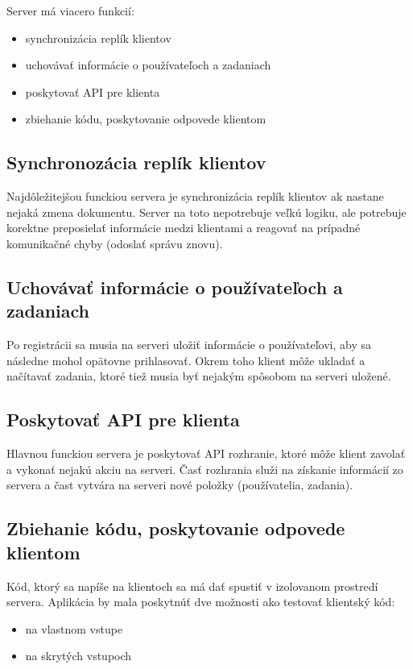 Server má viacero funkcií:
\begin{itemize}
\item synchronizácia replík klientov
\item uchovávať informácie o používateľoch a zadaniach
\item poskytovať API pre klienta
\item zbiehanie kódu, poskytovanie odpovede klientom
\end{itemize}

\subsection{Synchronozácia replík klientov}
Najdôležitejšou funckiou servera je synchronizácia replík klientov ak nastane nejaká zmena
dokumentu. Server na toto nepotrebuje veľkú logiku, ale potrebuje korektne preposielať informácie
medzi klientami a reagovať na prípadné komunikačné chyby (odoslať správu znovu).

\subsection{Uchovávať informácie o používateľoch a zadaniach}
Po registrácii sa musia na serveri uložiť informácie o používateľovi, aby sa následne mohol opätovne
prihlasovať. Okrem toho klient môže ukladať a načítavať zadania, ktoré tiež musia byť nejakým
spôsobom na serveri uložené.

\subsection{Poskytovať API pre klienta}
Hlavnou funckiou servera je poskytovať API rozhranie, ktoré môže klient zavolať a vykonať nejakú
akciu na serveri. Časť rozhrania služi na získanie informácií zo servera a čast vytvára
na serveri nové položky (používatelia, zadania).

\subsection{Zbiehanie kódu, poskytovanie odpovede klientom}
Kód, ktorý sa napíše na klientoch sa má dať spustiť v izolovanom prostredí servera. Aplikácia by
mala poskytnúť dve možnosti ako testovať klientský kód:
\begin{itemize}
\item na vlastnom vstupe
\item na skrytých vstupoch
\end{itemize}

